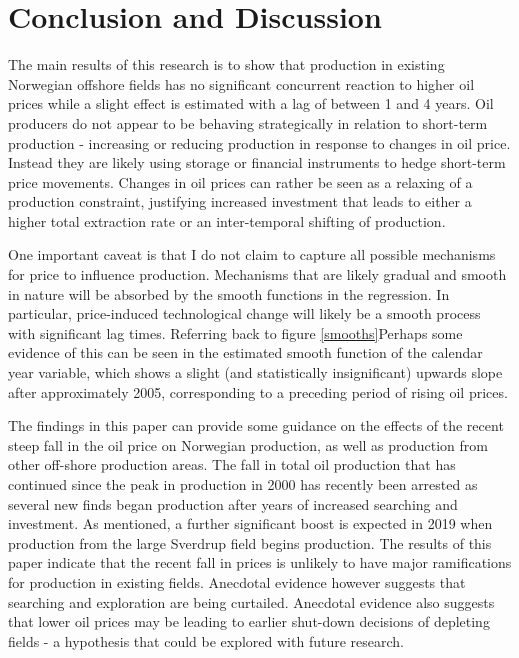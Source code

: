 \documentclass[11pt]{article}
\begin{document}
\section{Conclusion and Discussion}

The main results of this research is to show that production in existing Norwegian offshore fields has no significant concurrent reaction to higher oil prices while a slight effect is estimated  with a lag of between 1 and 4 years.  Oil producers do not appear to be behaving strategically in relation to short-term production - increasing or reducing production in response to changes in oil price.  Instead they are likely using storage or financial instruments to hedge short-term price movements. Changes in oil prices can rather be seen as a relaxing of a production constraint, justifying increased investment that leads to either a higher total extraction rate or an inter-temporal shifting of production.

One important caveat is that I do not claim to capture all possible mechanisms for price to influence production.  Mechanisms that are likely gradual and smooth in nature will be absorbed by the smooth functions in the regression. In particular, price-induced technological change will likely be a smooth process with significant lag times. Referring back to figure \ref{smooths}Perhaps some evidence of this can be seen in the estimated smooth function of the calendar year variable, which shows a slight (and statistically insignificant) upwards slope after approximately 2005, corresponding to a preceding period of rising oil prices.    

The findings in this paper can provide some guidance on the effects of the recent steep fall in the oil price on Norwegian production, as well as production from other off-shore production areas. The fall in total oil production that has continued since the peak in production in 2000 has recently been arrested as several new finds began production after years of increased searching and investment.  As mentioned, a further significant boost is expected in 2019 when production from the large Sverdrup field begins production. The results of this paper indicate that the recent fall in prices is unlikely to have major ramifications for production in existing fields.  Anecdotal evidence however suggests that searching and exploration are being curtailed. Anecdotal evidence also suggests that lower oil prices may be leading to earlier shut-down decisions of depleting fields - a hypothesis that could be explored with future research.  
\end{document}
